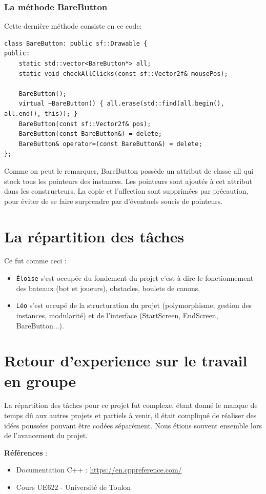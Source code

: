 \documentclass[a4paper,12pt]{article}
\begin{document}
\subsubsection{La méthode BareButton}
Cette dernière méthode consiste en ce code:
\begin{lstlisting}
class BareButton: public sf::Drawable {
public:
    static std::vector<BareButton*> all;
    static void checkAllClicks(const sf::Vector2f& mousePos);

    BareButton();
    virtual ~BareButton() { all.erase(std::find(all.begin(), all.end(), this)); }
    BareButton(const sf::Vector2f& pos);
    BareButton(const BareButton&) = delete;
    BareButton& operator=(const BareButton&) = delete;
};
\end{lstlisting}
Comme on peut le remarquer, BareButton possède un attribut de classe all
qui stock tous les pointeurs des instances. Les pointeurs sont ajoutés à cet attribut dans les constructeurs.
La copie et l'affection sont supprimées par précaution,
pour éviter de se faire
surprendre par d'éventuels soucis de pointeurs.

\section {La répartition des tâches}
Ce fut comme ceci :
\begin{itemize}
    \item \texttt{Éloïse} s'est occupée du fondement du projet c'est à dire
    le fonctionnement des bateaux (bot et joueurs), obstacles, boulets de canons.
    \item \texttt{Léo} s'est occupé de la structuration du projet (polymorphisme, gestion des instances, modularité)
    et de l'interface (StartScreen, EndScreen, BareButton...).
\end{itemize}

\section {Retour d'experience sur le travail en groupe}
La répartition des tâches pour ce projet fut complexe,
étant donné le manque de temps dû aux autres projets et partiels à venir,
il était compliqué de réaliser des idées poussées pouvant être
codées séparément. Nous étions souvent ensemble lors de l'avancement du projet.

\vfill
\noindent\textbf{Références} :
\begin{itemize}
    \item Documentation C++ : \url{https://en.cppreference.com/}
    \item Cours UE622 - Université de Toulon
\end{itemize}
\end{document}
